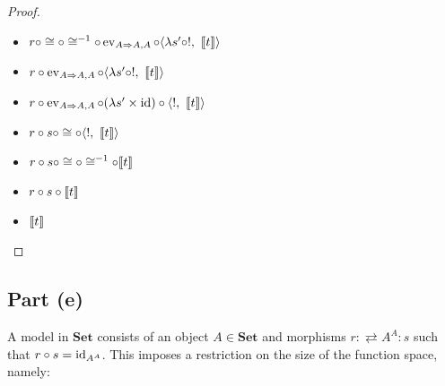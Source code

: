 \begin{prop}
\begin{proof}
\begin{itemize}
        \item[\eqs]
          $r\circ\cong\circ\cong^{-1}\circ\operatorname{ev}_{A\Rightarrow A,A}\circ\langle\lambda s^\prime\circ !,~\llbracket t \rrbracket\rangle$
          \marginnote{\Lemma-\ref{lemma:prod-term-iso}}

        \item[\eqs]
          $r\circ\operatorname{ev}_{A\Rightarrow A,A}\circ\langle\lambda s^\prime\circ !,~\llbracket t \rrbracket\rangle$

        \item[\eqs]
          $r\circ\operatorname{ev}_{A\Rightarrow A,A}\circ(\lambda s^\prime\times\operatorname{id})\circ\langle !,~\llbracket t \rrbracket\rangle$
          \marginnote{\Lemma-\ref{lemma:prod-comp-factor}}

        \item[\eqs]
          $r\circ s\circ\cong\circ\langle !,~\llbracket t \rrbracket\rangle$

        \item[\eqs]
          $r\circ s\circ\cong\circ\cong^{-1}\circ\llbracket t \rrbracket$
          \marginnote{\Lemma-\ref{lemma:prod-term-iso}}
        \item[\eqs]
          $r\circ s\circ\llbracket t \rrbracket$

        \item[\eqs]
          $\llbracket t \rrbracket$
          \qedhere
    \end{itemize}
  \end{proof}
\end{prop}


\subsection{Part (e)}\label{sec:q-2-e}

A model in $\mathbf{Set}$ consists of an object $A\in\mathbf{Set}$ and morphisms ${r : \rightleftarrows A^A : s}$ such that ${r\circ s = \operatorname{id}_{A^A}}$. This imposes a restriction on the size of the function space, namely:

